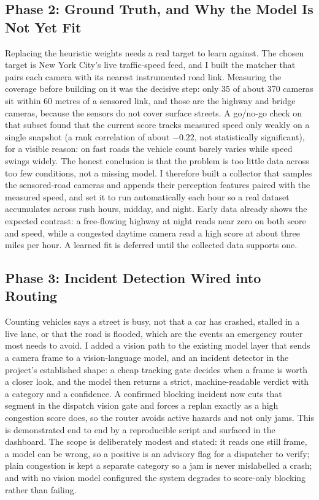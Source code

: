 \documentclass[12pt]{article}
\begin{document}
\subsection{Phase 2: Ground Truth, and Why the Model Is Not Yet Fit}

Replacing the heuristic weights needs a real target to learn against. The chosen
target is New York City's live traffic-speed feed, and I built the matcher that
pairs each camera with its nearest instrumented road link. Measuring the coverage
before building on it was the decisive step: only 35 of about 370 cameras sit
within 60 metres of a sensored link, and those are the highway and bridge cameras,
because the sensors do not cover surface streets. A go/no-go check on that subset
found that the current score tracks measured speed only weakly on a single
snapshot (a rank correlation of about $-0.22$, not statistically significant),
for a visible reason: on fast roads the vehicle count barely varies while speed
swings widely. The honest conclusion is that the problem is too little data across
too few conditions, not a missing model. I therefore built a collector that
samples the sensored-road cameras and appends their perception features paired
with the measured speed, and set it to run automatically each hour so a real
dataset accumulates across rush hours, midday, and night. Early data already shows
the expected contrast: a free-flowing highway at night reads near zero on both
score and speed, while a congested daytime camera read a high score at about three
miles per hour. A learned fit is deferred until the collected data supports one.

\subsection{Phase 3: Incident Detection Wired into Routing}

Counting vehicles says a street is busy, not that a car has crashed, stalled in a
live lane, or that the road is flooded, which are the events an emergency router
most needs to avoid. I added a vision path to the existing model layer that sends
a camera frame to a vision-language model, and an incident detector in the
project's established shape: a cheap tracking gate decides when a frame is worth a
closer look, and the model then returns a strict, machine-readable verdict with a
category and a confidence. A confirmed blocking incident now cuts that segment in
the dispatch vision gate and forces a replan exactly as a high congestion score
does, so the router avoids active hazards and not only jams. This is demonstrated
end to end by a reproducible script and surfaced in the dashboard. The scope is
deliberately modest and stated: it reads one still frame, a model can be wrong, so
a positive is an advisory flag for a dispatcher to verify; plain congestion is
kept a separate category so a jam is never mislabelled a crash; and with no vision
model configured the system degrades to score-only blocking rather than failing.
\end{document}
